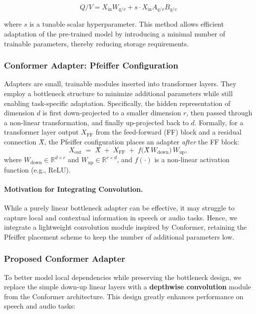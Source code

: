 \documentclass[11pt]{article}
\begin{document}
\begin{equation}
Q/V = X_{\text{in}} W_{q/v} + s \cdot X_{\text{in}} A_{q/v} B_{q/v}
\end{equation}

where $s$ is a tunable scalar hyperparameter. This method allows efficient adaptation of the pre-trained model by introducing a minimal number of trainable parameters, thereby reducing storage requirements.

\subsubsection{Conformer Adapter: Pfeiffer Configuration}
Adapters are small, trainable modules inserted into transformer layers. They employ a bottleneck structure to minimize additional parameters while still enabling task-specific adaptation. Specifically, the hidden representation of dimension $d$ is first down-projected to a smaller dimension $r$, then passed through a non-linear transformation, and finally up-projected back to $d$. Formally, for a transformer layer output $X_{\text{FF}}$ from the feed-forward (FF) block and a residual connection $X̂$, the Pfeiffer configuration places an adapter \emph{after} the FF block:
\begin{equation}
X_{\text{out}} \;=\; X̂ \;+\; X_{\text{FF}} \;+\; f\bigl(X̂\,W_{\text{down}}\bigr)\,W_{\text{up}},
\end{equation}
where $W_{\text{down}} \in \mathbb{R}^{d \times r}$ and $W_{\text{up}} \in \mathbb{R}^{r \times d}$, and $f(\cdot)$ is a non-linear activation function (e.g., ReLU). 

\paragraph{Motivation for Integrating Convolution.}
While a purely linear bottleneck adapter can be effective, it may struggle to capture local and contextual information in speech or audio tasks. Hence, we integrate a lightweight convolution module inspired by Conformer, retaining the Pfeiffer placement scheme to keep the number of additional parameters low.

\subsubsection{Proposed Conformer Adapter}
To better model local dependencies while preserving the bottleneck design, we replace the simple down-up linear layers with a \textbf{depthwise convolution} module from the Conformer architecture. This design greatly enhances performance on speech and audio tasks:
\end{document}
